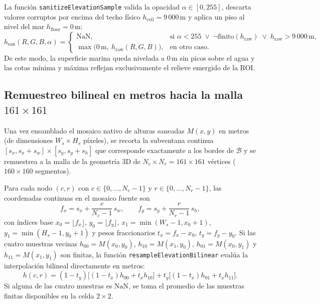 \documentclass[11pt,a4paper]{article}
\newcommand{\unit}[1]{\mathrm{#1}}
\begin{document}
La función \texttt{sanitizeElevationSample} valida la opacidad $\alpha\in[0,255]$, descarta valores corruptos
por encima del techo físico $h_{\mathrm{ceil}}=9\,000\,\unit{m}$ y aplica un piso al nivel del mar
$h_{\mathrm{floor}}=0\,\unit{m}$:
\begin{equation}
  h_{\mathrm{san}}(R,G,B,\alpha) =
  \begin{cases}
    \mathrm{NaN}, & \text{si } \alpha < 255 \;\vee\; \neg\text{finito}(h_{\mathrm{raw}}) \;\vee\; h_{\mathrm{raw}} > 9\,000\,\unit{m},\\[4pt]
    \max\bigl(0\,\unit{m},\ h_{\mathrm{raw}}(R,G,B)\bigr), & \text{en otro caso.}
  \end{cases}
  \label{eq:saneamiento-costero}
\end{equation}
De este modo, la superficie marina queda nivelada a $0\,\unit{m}$ sin picos sobre el agua y las cotas mínima y
máxima reflejan exclusivamente el relieve emergido de la ROI.

\subsection{Remuestreo bilineal en metros hacia la malla \texorpdfstring{$161\times161$}{161x161}}
\label{sec:relieve3d-bilineal}

Una vez ensamblado el mosaico nativo de alturas saneadas $M(x,y)$ en metros (de dimensiones
$W_s\times H_s$ píxeles), se recorta la subventana continua $[s_x, s_x+s_w]\times[s_y, s_y+s_h]$ que
corresponde exactamente a los bordes de $\mathcal{B}$ y se remuestrea a la malla de la geometría 3D de
$N_c\times N_r = 161\times161$ vértices ($160\times160$ segmentos).

Para cada nodo $(c,r)$ con $c\in\{0,\ldots,N_c-1\}$ y $r\in\{0,\ldots,N_r-1\}$, las coordenadas continuas en
el mosaico fuente son
\begin{equation}
  f_x = s_x + \frac{c}{N_c - 1}\,s_w,
  \qquad
  f_y = s_y + \frac{r}{N_r - 1}\,s_h,
\end{equation}
con índices base $x_0=\lfloor f_x\rfloor$, $y_0=\lfloor f_y\rfloor$, $x_1=\min(W_s-1,x_0+1)$,
$y_1=\min(H_s-1,y_0+1)$ y pesos fraccionarios $t_x = f_x - x_0$, $t_y = f_y - y_0$. Si las cuatro muestras
vecinas $h_{00}=M(x_0,y_0)$, $h_{10}=M(x_1,y_0)$, $h_{01}=M(x_0,y_1)$ y $h_{11}=M(x_1,y_1)$ son finitas, la
función \texttt{resampleElevationBilinear} evalúa la interpolación bilineal directamente en metros:
\begin{equation}
  h(c,r) = (1 - t_y)\bigl[(1 - t_x)h_{00} + t_x h_{10}\bigr]
         + t_y\bigl[(1 - t_x)h_{01} + t_x h_{11}\bigr].
  \label{eq:bilineal-metros}
\end{equation}
Si alguna de las cuatro muestras es $\mathrm{NaN}$, se toma el promedio de las muestras finitas disponibles en
la celda $2\times2$.
\end{document}
